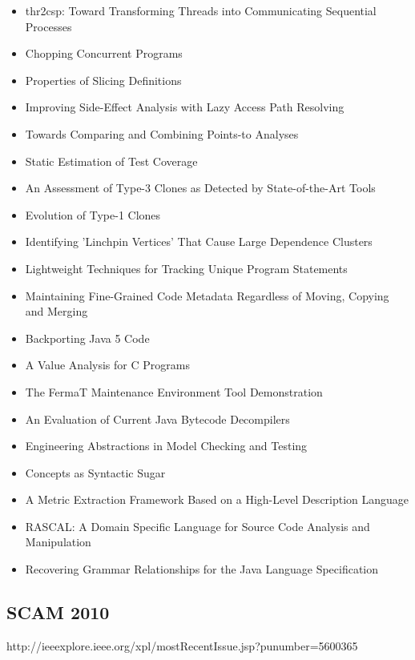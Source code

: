 {\small
\begin{itemize}[itemsep=-1ex]
  \item thr2csp: Toward Transforming Threads into Communicating Sequential Processes
  \item Chopping Concurrent Programs
  \item Properties of Slicing Definitions
  \item Improving Side-Effect Analysis with Lazy Access Path Resolving
  \item Towards Comparing and Combining Points-to Analyses
  \item Static Estimation of Test Coverage
  \item An Assessment of Type-3 Clones as Detected by State-of-the-Art Tools
  \item Evolution of Type-1 Clones
  \item Identifying 'Linchpin Vertices' That Cause Large Dependence Clusters
  \item Lightweight Techniques for Tracking Unique Program Statements
  \item Maintaining Fine-Grained Code Metadata Regardless of Moving, Copying and Merging
  \item Backporting Java 5 Code
  \item A Value Analysis for C Programs
  \item The FermaT Maintenance Environment Tool Demonstration
  \item An Evaluation of Current Java Bytecode Decompilers
  \item Engineering Abstractions in Model Checking and Testing
  \item Concepts as Syntactic Sugar
  \item A Metric Extraction Framework Based on a High-Level Description Language
  \item RASCAL: A Domain Specific Language for Source Code Analysis and Manipulation
  \item Recovering Grammar Relationships for the Java Language Specification
\end{itemize}
}

\subsection{SCAM 2010}

http://ieeexplore.ieee.org/xpl/mostRecentIssue.jsp?punumber=5600365

